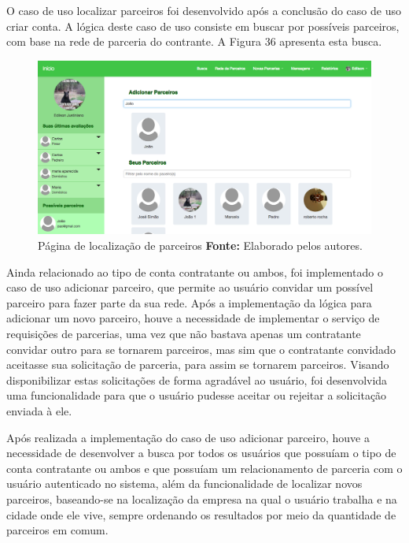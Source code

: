 \par O caso de uso localizar parceiros foi desenvolvido após a conclusão do caso de uso criar conta. A lógica deste caso de uso consiste em buscar por possíveis parceiros, com base na rede de parceria do contrante. A Figura 36 apresenta esta busca.

\begin{figure}[h!]
	\centerline{\includegraphics[scale=0.35]{./imagens/localizar-parceiro.png}}
	\caption[Página de localização de parceiros]
	{Página de localização de parceiros \textbf{Fonte:} Elaborado pelos autores.}
	\label{fig:exemplo1}
\end{figure}

\newpage



\par Ainda relacionado ao tipo de conta contratante ou ambos, foi implementado o caso de uso adicionar parceiro, que permite ao usuário convidar um possível parceiro para fazer parte da sua rede. Após a implementação da lógica para adicionar um novo parceiro, houve a necessidade de implementar o serviço de requisições de parcerias, uma vez que não bastava apenas um contratante convidar outro para se tornarem parceiros, mas sim que o contratante convidado aceitasse sua solicitação de parceria, para assim se tornarem parceiros. Visando disponibilizar estas solicitações de forma agradável ao usuário, foi desenvolvida uma funcionalidade para que o usuário pudesse aceitar ou rejeitar a solicitação enviada à ele.

\par Após realizada a implementação do caso de uso adicionar parceiro, houve a necessidade de desenvolver a busca por todos os usuários que possuíam o tipo de conta contratante ou ambos e que possuíam um relacionamento de parceria com o usuário autenticado no sistema, além da funcionalidade de localizar novos parceiros, baseando-se na localização da empresa na qual o usuário trabalha e na cidade onde ele vive, sempre ordenando os resultados por meio da quantidade de parceiros em comum. 

